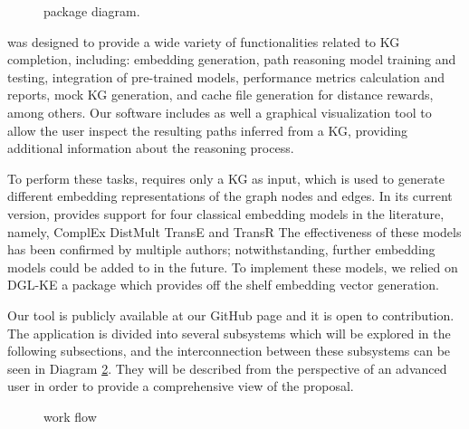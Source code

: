 \begin{figure}[!h]
    \centering
    
    \caption{\toolname{} package diagram.}
    \label{fig:classdiagram}
\end{figure}

\toolname{} was designed to provide a wide variety of functionalities related to KG completion, including: embedding generation, path reasoning model training and testing, integration of pre-trained models, performance metrics calculation and reports, mock KG generation, and cache file generation for distance rewards, among others. Our software includes as well a graphical visualization tool to allow the user inspect the resulting paths inferred from a KG, providing additional information about the reasoning process.

To perform these tasks, \toolname{} requires only a KG as input, which is used to generate different embedding representations of the graph nodes and edges. In its current version, \toolname{} provides support for four classical embedding models in the literature, namely, ComplEx 
DistMult 
TransE 
and TransR 
The effectiveness of these models has been confirmed by multiple authors; notwithstanding, further embedding models could be added to \toolname{} in the future. To implement these models, we relied on DGL-KE 
a package which provides off the shelf embedding vector generation.

Our tool is publicly available at our GitHub page 
and it is open to contribution. The application is divided into several subsystems which will be explored in the following subsections, and the interconnection between these subsystems can be seen in Diagram \ref{fig:tool_flow}. They will be described from the perspective of an advanced user in order to provide a comprehensive view of the proposal.


\begin{figure}[htp]
    \centering
    
    \caption{\toolname{} work flow}
    \label{fig:tool_flow}
\end{figure}



